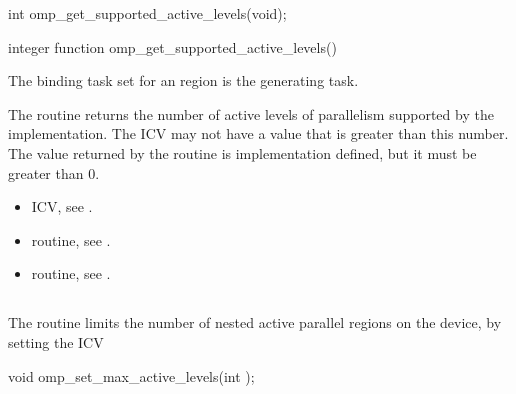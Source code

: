\format
\begin{ccppspecific}
\begin{ompcFunction}
int omp_get_supported_active_levels(void);
\end{ompcFunction}
\end{ccppspecific}

\begin{fortranspecific}
\begin{ompfFunction}
integer function omp_get_supported_active_levels()
\end{ompfFunction}
\end{fortranspecific}

\binding
The binding task set for an 
region is the generating task.

\effect
The  routine returns the
number of active levels of parallelism supported by the implementation. The
 ICV may not have a value that is greater than
this number. The value returned by the 
routine is implementation defined, but it must be greater than 0.

\crossreferences
\begin{itemize}
\item {} ICV, see
.

\item {} routine, see
.

\item {} routine, see
.
\end{itemize}








\subsection{}
\label{subsec:omp_set_max_active_levels}
\summary
The  routine limits the number of nested active
parallel regions on the device, by setting the  ICV


\format
\begin{ccppspecific}
\begin{ompcFunction}
void omp_set_max_active_levels(int );
\end{ompcFunction}
\end{ccppspecific}

